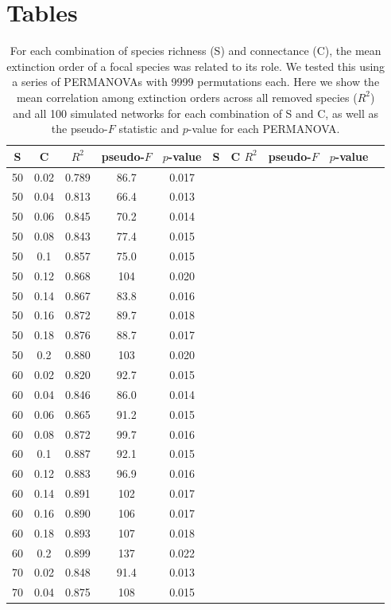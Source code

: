 \documentclass[12pt]{article}
\begin{document}
     


\section{Tables}


	\begin{table}[h!]
		\caption{For each combination of species richness (S) and connectance (C), the mean extinction order of a focal species was related to its role. We tested this using a series of PERMANOVAs with 9999 permutations each. Here we show the mean correlation among extinction orders across all removed species ($R^2$) and all 100 simulated networks for each combination of S and C, as well as the pseudo-$F$ statistic and $p$-value for each PERMANOVA.}
		\label{permtable}
		\begin{tabular}{c c | c | c c ||c c | c | c c |}
			S	&	C	&	$R^2$	&	pseudo-$F$	&	$p$-value	&	S	&	C	$R^2$	&	pseudo-$F$	&	$p$-value\\ 
			\hline
			50&0.02&0.789&86.7&0.017\\ 
			50&0.04&0.813&66.4&0.013\\ 
			50&0.06&0.845&70.2&0.014\\ 
			50&0.08&0.843&77.4&0.015\\ 
			50&0.1&0.857&75.0&0.015\\ 
			50&0.12&0.868&104&0.020\\ 
			50&0.14&0.867&83.8&0.016\\ 
			50&0.16&0.872&89.7&0.018\\ 
			50&0.18&0.876&88.7&0.017\\ 
			50&0.2&0.880&103&0.020\\ 
			60&0.02&0.820&92.7&0.015\\ 
			60&0.04&0.846&86.0&0.014\\ 
			60&0.06&0.865&91.2&0.015\\ 
			60&0.08&0.872&99.7&0.016\\ 
			60&0.1&0.887&92.1&0.015\\ 
			60&0.12&0.883&96.9&0.016\\ 
			60&0.14&0.891&102&0.017\\ 
			60&0.16&0.890&106&0.017\\ 
			60&0.18&0.893&107&0.018\\ 
			60&0.2&0.899&137&0.022\\ 
			70&0.02&0.848&91.4&0.013\\ 
			70&0.04&0.875&108&0.015\\ 

\end{tabular}
\end{table}
\end{document}
